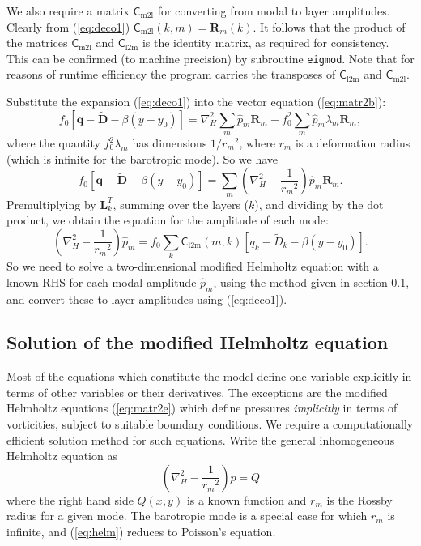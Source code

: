 \documentclass[11pt, a4paper,twoside]{article}
\newcommand{\rdm}[0]{{r_m}}
\newcommand{\vc}[1]{\mathbf{#1}}
\newcommand{\mtx}[1]{\vc{\mathsf{#1}}}
\newcommand{\cml}[0]{\mtx{C}_{\mathrm{m2l}}}
\newcommand{\clm}[0]{\mtx{C}_{\mathrm{l2m}}}
\newcommand{\Dt}[1]{\vc{{}^{#1}\tilde{D}}}
\numberwithin{equation}{section}
\begin{document}
We also require a matrix $\cml$ for converting from modal to layer
amplitudes.
Clearly from (\ref{eq:deco1}) $\cml (k,m) =  \vc{R}_m(k)$.
It follows that the product of the matrices $\cml$ and $\clm$  is the identity matrix, as required for consistency.
This can be confirmed (to machine precision) by subroutine \verb=eigmod=.
Note that  for reasons of runtime efficiency the program carries the transposes of  $\clm$ and $\cml$.

Substitute the expansion (\ref{eq:deco1}) into the vector equation (\ref{eq:matr2b}):
\begin{equation}\label{eq:matr2c}
f_0 [\vc{q} -\Dt{} - \beta(y-y_0) ] =  \nabla_H^2  \sum_m \hat{p}_m  \vc{R}_m  - f_0^2 \sum_m \hat{p}_m  \lambda_m \vc{R}_m,
\end{equation}
where the quantity $f_0^2 \lambda_m$ has dimensions $1/\rdm^2$, where $\rdm$ is a
deformation radius (which is infinite for the barotropic mode).
So we have
\begin{equation}\label{eq:matr2d}
f_0 [\vc{q} -\Dt{} - \beta(y-y_0)  ] =  \sum_m \left(\nabla_H^2   - \frac{1}{\rdm^2} \right) \hat{p}_m \vc{R}_m.
\end{equation}
Premultiplying by $\vc{L}^T_k$, summing over the layers ($k$), and dividing by the dot product, we obtain the equation for the amplitude of each mode:
\begin{equation}\label{eq:matr2e}
\left(\nabla_H^2   - \frac{1}{\rdm^2} \right) \hat{p}_m = f_0 \sum_k \clm(m,k) [q_k -\tilde{D}_k - \beta(y-y_0) ].
\end{equation}
So we need to solve a two-dimensional modified Helmholtz equation with a known RHS for each modal amplitude $\hat{p}_m$, using the method given in section \ref{sub:helm}, and convert these to layer amplitudes using (\ref{eq:deco1}).

\subsection{Solution of the modified Helmholtz equation}\label{sub:helm}
Most of the equations which constitute the model define one variable explicitly in terms of other variables or their derivatives.
The exceptions are the modified Helmholtz equations (\ref{eq:matr2e}) which define pressures \emph{implicitly} in terms of vorticities, subject to suitable boundary conditions.
We require a computationally efficient solution method for such equations.
Write the general inhomogeneous Helmholtz equation as
\begin{equation}\label{eq:helm}
\left(\nabla_H^2 - \frac{1}{\rdm^2}\right) p = Q
\end{equation}
where the right hand side $ Q(x,y)$ is a known function and $\rdm$ is the Rossby radius for a given mode.
The barotropic mode is a special case for which $\rdm$ is infinite, and (\ref{eq:helm}) reduces to Poisson's equation.
\end{document}
